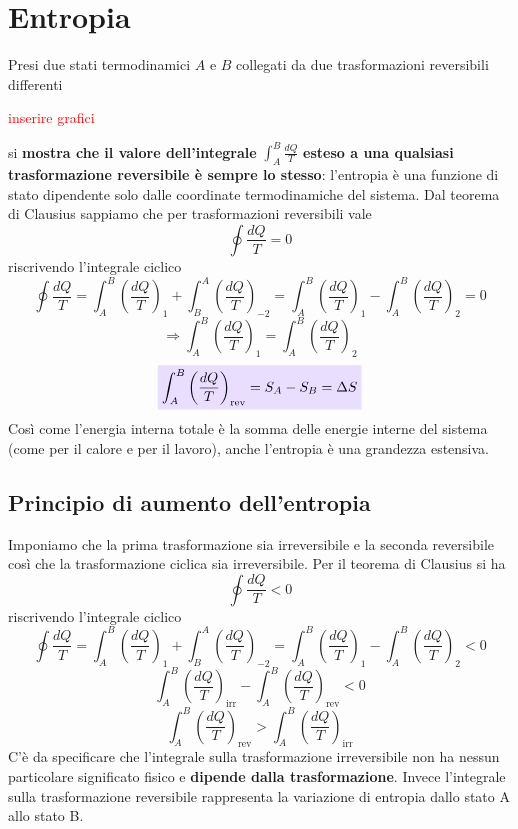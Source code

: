 \documentclass[x11names]{report}
\newcommand{\viola}[1]{\colorbox{yred}{$\displaystyle #1$}}
\begin{document}
\section{Entropia}
Presi due stati termodinamici \(A\) e \(B\) collegati da due trasformazioni reversibili differenti
\begin{center}
	\textcolor{red}{inserire grafici}
\end{center}
si \textbf{mostra che il valore dell'integrale} \(\int_{A}^{B}\frac{dQ}{T}\) \textbf{esteso a una qualsiasi trasformazione reversibile è sempre lo stesso}: l'entropia è una funzione di stato dipendente solo dalle coordinate termodinamiche del sistema. Dal teorema di Clausius sappiamo che per trasformazioni reversibili vale
\[ 
\oint \frac{dQ}{T} = 0 
\]
riscrivendo l'integrale ciclico
\[ 
\oint \frac{dQ}{T} = \int_{A}^{B}\left(\frac{dQ}{T}\right)_{1} + \int_{B}^{A}\left(\frac{dQ}{T}\right)_{-2} = \int_{A}^{B}\left(\frac{dQ}{T}\right)_{1} - \int_{A}^{B}\left(\frac{dQ}{T}\right)_{2} = 0
\]
\[ 
\Rightarrow \int_{A}^{B}\left(\frac{dQ}{T}\right)_{1} = \int_{A}^{B}\left(\frac{dQ}{T}\right)_{2}
\]
\begin{equation}
	\viola{\int_{A}^{B}\left(\frac{dQ}{T}\right)_{\text{rev}} = S_{A} - S_{B} = \Delta S}
\end{equation}
Così come l'energia interna totale è la somma delle energie interne del sistema (come per il calore e per il lavoro), anche l'entropia è una grandezza estensiva. 

\subsection{Principio di aumento dell'entropia}
Imponiamo che la prima trasformazione sia irreversibile e la seconda reversibile così che la trasformazione ciclica sia irreversibile. Per il teorema di Clausius si ha
\[ 
\oint \frac{dQ}{T} < 0
\]
riscrivendo l'integrale ciclico
\[ 
\oint \frac{dQ}{T} = \int_{A}^{B}\left(\frac{dQ}{T}\right)_{1} + \int_{B}^{A}\left(\frac{dQ}{T}\right)_{-2} = \int_{A}^{B}\left(\frac{dQ}{T}\right)_{1} - \int_{A}^{B}\left(\frac{dQ}{T}\right)_{2} < 0
\]
\[ 
\int_{A}^{B}\left(\frac{dQ}{T}\right)_{\text{irr}} - \int_{A}^{B}\left(\frac{dQ}{T}\right)_{\text{rev}} < 0
\]
\[ 
\int_{A}^{B}\left(\frac{dQ}{T}\right)_{\text{rev}} > \int_{A}^{B}\left(\frac{dQ}{T}\right)_{\text{irr}} 
\]
C'è da specificare che l'integrale sulla trasformazione irreversibile non ha nessun particolare significato fisico e \textbf{dipende dalla trasformazione}. Invece l'integrale sulla trasformazione reversibile rappresenta la variazione di entropia dallo stato A allo stato B.
\end{document}
